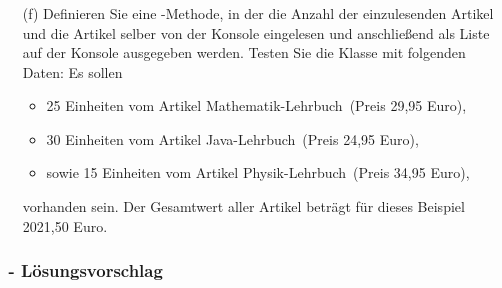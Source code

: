 \begin{frame}%
  \frametitle{\stitle}%
\begin{enumerate}
\item[(f)]
  Definieren Sie eine -Methode, in der die Anzahl der einzulesenden Artikel und die Artikel selber von der Konsole eingelesen und anschließend als Liste auf der Konsole ausgegeben werden.
  Testen Sie die Klasse mit folgenden Daten: Es sollen
\begin{itemize}
\item 25 Einheiten vom Artikel \glqq Mathematik-Lehrbuch\grqq\ (Preis 29{,}95 Euro),
\item 30 Einheiten vom Artikel \glqq Java-Lehrbuch\grqq\ (Preis 24{,}95 Euro),
\item sowie 15 Einheiten vom Artikel \glqq Physik-Lehrbuch\grqq\ (Preis 34{,}95 Euro),
\end{itemize}
vorhanden sein. Der Gesamtwert aller Artikel betr\"agt für dieses Beispiel 2021{,}50 Euro.
\end{enumerate}
\end{frame}


\begin{frame}%
  \frametitle{\stitle\ - L\"osungsvorschlag}%

\end{frame}
